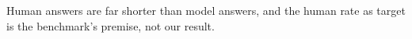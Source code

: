 Human answers are far shorter than model answers, and the human rate as
target is the benchmark's premise, not our result.
